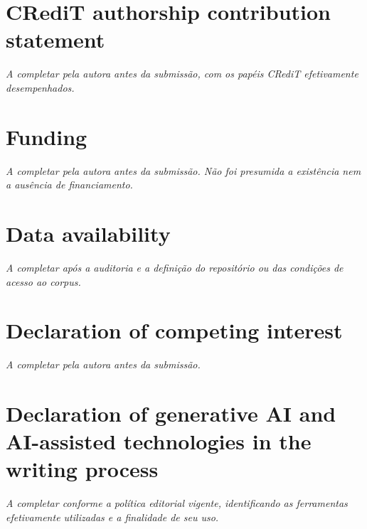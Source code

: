 \documentclass[preprint,12pt,authoryear]{elsarticle}
\begin{document}
\section*{CRediT authorship contribution statement}
\textit{A completar pela autora antes da submissão, com os papéis CRediT efetivamente desempenhados.}

\section*{Funding}
\textit{A completar pela autora antes da submissão. Não foi presumida a existência nem a ausência de financiamento.}

\section*{Data availability}
\textit{A completar após a auditoria e a definição do repositório ou das condições de acesso ao corpus.}

\section*{Declaration of competing interest}
\textit{A completar pela autora antes da submissão.}

\section*{Declaration of generative AI and AI-assisted technologies in the writing process}
\textit{A completar conforme a política editorial vigente, identificando as ferramentas efetivamente utilizadas e a finalidade de seu uso.}
\end{document}

